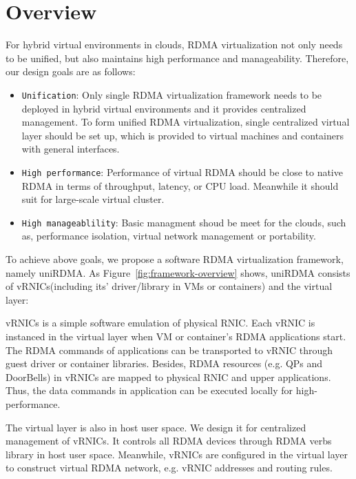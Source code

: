 \section{Overview}

For hybrid virtual environments in clouds, RDMA virtualization not only needs to be unified, but also maintains high performance and manageability. Therefore, our design goals are as follows:

\begin{itemize}
	\item {\verb|Unification|}: Only single RDMA virtualization framework needs to be deployed in hybrid virtual environments and it provides centralized management.
	To form unified RDMA virtualization, single centralized virtual layer should be set up, which is provided to virtual machines and containers with general interfaces.
	\item {\verb|High performance|}: Performance of virtual RDMA should be close to native RDMA in terms of throughput, latency, or CPU load. Meanwhile it should suit for large-scale virtual cluster.
	\item {\verb|High manageablility|}: Basic managment shoud be meet for the clouds, such as, performance isolation, virtual network management or  portability.
\end{itemize}

To achieve above goals, we propose a software RDMA virtualization framework, namely uniRDMA. As Figure~\ref{fig:framework-overview} shows, uniRDMA consists of vRNICs(including its' driver/library in VMs or containers) and the virtual layer:

vRNICs is a simple software emulation of physical RNIC. Each vRNIC is instanced in the virtual layer when VM or container's RDMA applications start. The RDMA commands of applications can be transported to vRNIC through guest driver or container libraries. Besides, RDMA resources (e.g. QPs and DoorBells) in vRNICs are mapped to physical RNIC and upper applications. Thus, the data commands in application can be executed locally for high-performance.

The virtual layer is also in host user space. We design it for centralized management of vRNICs. It controls all RDMA devices through RDMA verbs library in host user space. Meanwhile, vRNICs are configured in the virtual layer to construct virtual RDMA network, e.g. vRNIC addresses and routing rules.

